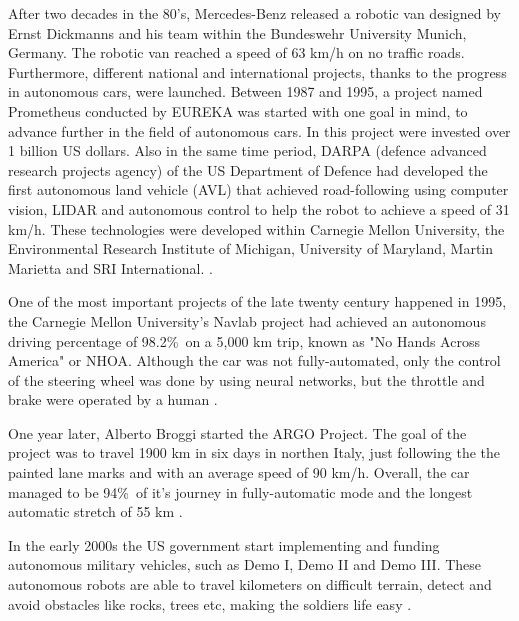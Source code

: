 After two decades in the 80's, Mercedes-Benz released a robotic van designed by Ernst Dickmanns and his team within the Bundeswehr University Munich, Germany. The robotic van reached a speed of 63 km/h on no traffic roads. Furthermore, different national and international projects, thanks to the progress in autonomous cars, were launched. Between 1987 and 1995, a project named Prometheus conducted by EUREKA was started with one goal in mind, to advance further in the field of autonomous cars. In this project were invested over 1 billion US dollars. Also in the same time period, DARPA (defence advanced research projects agency) of the US Department of Defence had developed the first autonomous land vehicle (AVL) that achieved road-following using computer vision, LIDAR and autonomous control to help the robot to achieve a speed of 31 km/h. These technologies were developed within Carnegie Mellon University, the Environmental Research Institute of Michigan, University of Maryland, Martin Marietta and SRI International. \cite{AutoAI}. \par

One of the most important projects of the late twenty century happened in 1995, the Carnegie Mellon University’s Navlab project had achieved an autonomous driving percentage of 98.2\%\ on a 5,000 km trip, known as "No Hands Across America" or NHOA. Although the car was not fully-automated, only the control of the steering wheel was done by using neural networks, but the throttle and brake were operated by a human \cite{AutoAI}. \par  

One year later, Alberto Broggi started the ARGO Project. The goal of the project was to travel 1900 km in six days in northen Italy, just following the the painted lane marks and with an average speed of 90 km/h. Overall, the car managed to be 94\%\ of it's journey in fully-automatic mode and the longest automatic stretch of 55 km \cite{AutoAI}. \par 

In the early 2000s the US government start implementing and funding autonomous military vehicles, such as Demo I, Demo II and Demo III. These autonomous robots are able to travel kilometers on difficult terrain, detect and avoid obstacles like rocks, trees etc, making the soldiers life easy \cite{AutoAI}. \par

